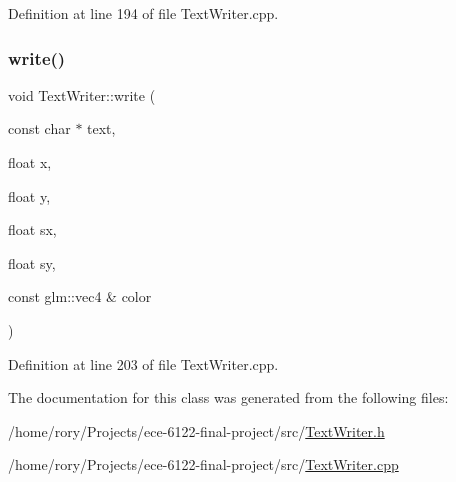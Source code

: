 Definition at line 194 of file Text\+Writer.\+cpp.

\mbox{\label{class_text_writer_a26b8bbd68df18171d18eafd7ebaab8e3}} 
\subsubsection{\texorpdfstring{write()}{write()}}
{\footnotesize\ttfamily void Text\+Writer\+::write (\begin{DoxyParamCaption}\item[{const char $\ast$}]{text,  }\item[{float}]{x,  }\item[{float}]{y,  }\item[{float}]{sx,  }\item[{float}]{sy,  }\item[{const glm\+::vec4 \&}]{color }\end{DoxyParamCaption})}



Definition at line 203 of file Text\+Writer.\+cpp.



The documentation for this class was generated from the following files\+:\begin{DoxyCompactItemize}
\item 
/home/rory/\+Projects/ece-\/6122-\/final-\/project/src/\hyperlink{_text_writer_8h}{Text\+Writer.\+h}\item 
/home/rory/\+Projects/ece-\/6122-\/final-\/project/src/\hyperlink{_text_writer_8cpp}{Text\+Writer.\+cpp}\end{DoxyCompactItemize}
